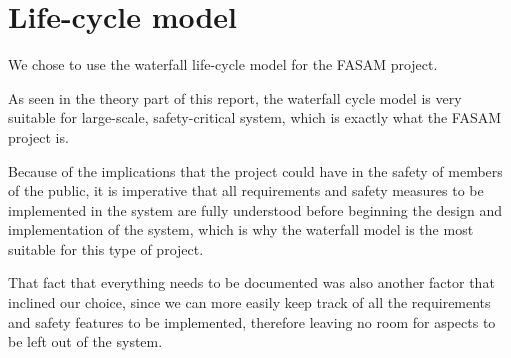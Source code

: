 \chapter{Life-cycle model}
We chose to use the waterfall life-cycle model for the FASAM project.

As seen in the theory part of this report, the waterfall cycle model is very suitable for large-scale, safety-critical system, which is exactly what the FASAM project is.

Because of the implications that the project could have in the safety of members of the public, it is imperative that all requirements and safety measures to be implemented in the system are fully understood before beginning the design and implementation of the system, which is why the waterfall model is the most suitable for this type of project.

That fact that everything needs to be documented was also another factor that inclined our choice, since we can more easily keep track of all the requirements and safety features to be implemented, therefore leaving no room for aspects to be left out of the system.